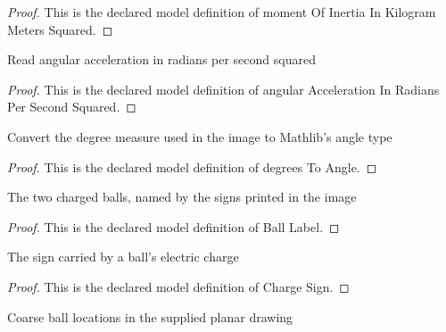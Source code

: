 \begin{proof}
  This is the declared model definition of moment Of Inertia In Kilogram Meters Squared.
\end{proof}
\begin{definition}
  \label{def:physics:phyx-mini-0910:phyxminiproblems-problemphyxmini0910-angularaccelerationinradianspersecondsquared}
  Read angular acceleration in radians per second squared
\end{definition}
\begin{proof}
  This is the declared model definition of angular Acceleration In Radians Per Second Squared.
\end{proof}
\begin{definition}
  \label{def:physics:phyx-mini-0910:phyxminiproblems-problemphyxmini0910-degreestoangle}
  Convert the degree measure used in the image to Mathlib's angle type
\end{definition}
\begin{proof}
  This is the declared model definition of degrees To Angle.
\end{proof}
\begin{definition}
  \label{def:physics:phyx-mini-0910:phyxminiproblems-problemphyxmini0910-balllabel}
  The two charged balls, named by the signs printed in the image
\end{definition}
\begin{proof}
  This is the declared model definition of Ball Label.
\end{proof}
\begin{definition}
  \label{def:physics:phyx-mini-0910:phyxminiproblems-problemphyxmini0910-chargesign}
  The sign carried by a ball's electric charge
\end{definition}
\begin{proof}
  This is the declared model definition of Charge Sign.
\end{proof}
\begin{definition}
  \label{def:physics:phyx-mini-0910:phyxminiproblems-problemphyxmini0910-ballplacement}
  Coarse ball locations in the supplied planar drawing
\end{definition}
